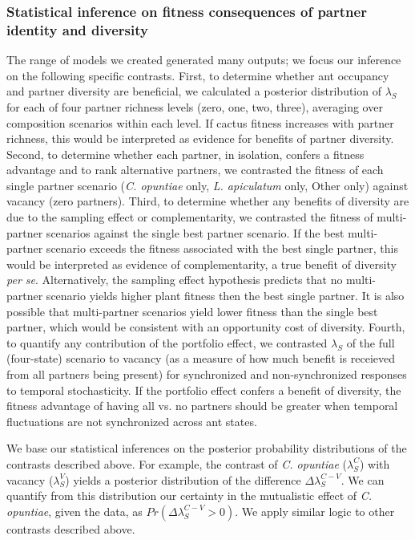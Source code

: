 \documentclass[11pt]{article}
\begin{document}
\subsubsection*{Statistical inference on fitness consequences of partner identity and diversity}
The range of models we created generated many outputs; we focus our inference on the following specific contrasts. 
First, to determine whether ant occupancy and partner diversity are beneficial, we calculated a posterior distribution of $\lambda_{S}$ for each of four partner richness levels (zero, one, two, three), averaging over composition scenarios within each level. 
If cactus fitness increases with partner richness, this would be interpreted as evidence for benefits of partner diversity. 
Second, to determine whether each partner, in isolation, confers a fitness advantage and to rank alternative partners, we contrasted the fitness of each single partner scenario (\textit{C. opuntiae} only, \textit{L. apiculatum} only, Other only) against vacancy (zero partners). 
Third, to determine whether any benefits of diversity are due to the sampling effect or complementarity, we contrasted the fitness of multi-partner scenarios against the single best partner scenario. 
If the best multi-partner scenario exceeds the fitness associated with the best single partner, this would be interpreted as evidence of complementarity, a true benefit of diversity \emph{per se}. 
Alternatively, the sampling effect hypothesis predicts that no multi-partner scenario yields higher plant fitness then the best single partner. 
It is also possible that multi-partner scenarios yield lower fitness than the single best partner, which would be consistent with an opportunity cost of diversity. 
Fourth, to quantify any contribution of the portfolio effect, we contrasted $\lambda_{S}$ of the full (four-state) scenario to vacancy (as a measure of how much benefit is receieved from all partners being present) for synchronized and non-synchronized responses to temporal stochasticity. 
If the portfolio effect confers a benefit of diversity, the fitness advantage of having all vs. no partners should be greater when temporal fluctuations are not synchronized across ant states.

We base our statistical inferences on the posterior probability distributions of the contrasts described above. 
For example, the contrast of \textit{C. opuntiae} ($\lambda^{C}_{S}$) with vacancy ($\lambda^{V}_{S}$) yields a posterior distribution of the difference $\Delta\lambda^{C-V}_{S}$. 
We can quantify from this distribution our certainty in the mutualistic effect of \textit{C. opuntiae}, given the data, as $Pr(\Delta\lambda^{C-V}_{S}>0)$. 
We apply similar logic to other contrasts described above. 
\end{document}
